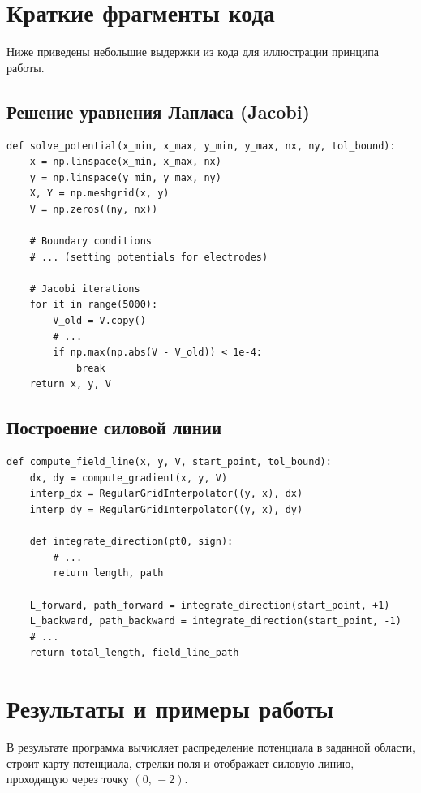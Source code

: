 \documentclass[12pt]{article}
\begin{document}
\section*{Краткие фрагменты кода}

Ниже приведены небольшие выдержки из кода для иллюстрации принципа работы.

\subsection*{Решение уравнения Лапласа (Jacobi)}
\begin{verbatim}
def solve_potential(x_min, x_max, y_min, y_max, nx, ny, tol_bound):
    x = np.linspace(x_min, x_max, nx)
    y = np.linspace(y_min, y_max, ny)
    X, Y = np.meshgrid(x, y)
    V = np.zeros((ny, nx))

    # Boundary conditions
    # ... (setting potentials for electrodes)

    # Jacobi iterations
    for it in range(5000):
        V_old = V.copy()
        # ...
        if np.max(np.abs(V - V_old)) < 1e-4:
            break
    return x, y, V
\end{verbatim}

\subsection*{Построение силовой линии}
\begin{verbatim}
def compute_field_line(x, y, V, start_point, tol_bound):
    dx, dy = compute_gradient(x, y, V)
    interp_dx = RegularGridInterpolator((y, x), dx)
    interp_dy = RegularGridInterpolator((y, x), dy)

    def integrate_direction(pt0, sign):
        # ...
        return length, path

    L_forward, path_forward = integrate_direction(start_point, +1)
    L_backward, path_backward = integrate_direction(start_point, -1)
    # ...
    return total_length, field_line_path
\end{verbatim}

\section*{Результаты и примеры работы}

В результате программа вычисляет распределение потенциала в заданной области, строит карту потенциала, стрелки поля и отображает силовую линию, проходящую через точку \((0,\,-2)\).
\end{document}
